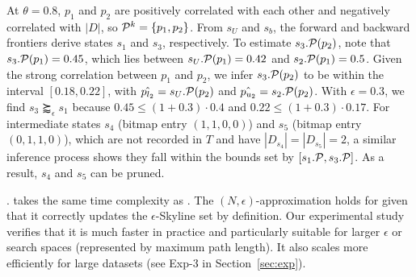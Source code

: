 \begin{example}

At $\theta=0.8$, $p_1$ and $p_2$ are positively correlated with each other and negatively correlated with $|D|$, so $\P^k = \{p_1, p_2\}$.
From $s_U$ and $s_b$, the forward and backward frontiers derive states $s_1$ and $s_3$, respectively.
To estimate $s_3.\P(p_2)$, note that $s_3.\P(p_1) = 0.45$, which lies between $s_U.\P(p_1) = 0.42$ and $s_2.\P(p_1) = 0.5$.
Given the strong correlation between $p_1$ and $p_2$,
we infer $s_3.\P(p_2)$ to be within the interval 
$[0.18, 0.22]$, with $\hat{p_{l_2}} = s_U.\P(p_2)$ and $\hat{p_{u_2}} = s_2.\P(p_2)$. 
With $\epsilon=0.3$, we find $s_3 \succapprox_{\epsilon} s_1$ because $0.45 \leq (1+0.3)\cdot0.4$ and $0.22 \leq (1+0.3)\cdot0.17$. 
For intermediate states $s_4$ (bitmap entry $(1, 1, 0, 0)$) and $s_5$ (bitmap entry $(0, 1, 1, 0)$), which are not recorded in $T$ and have $|D_{s_4}| = |D_{s_5}| = 2$, a similar inference process shows they fall within the bounds set by $[s_1.\P, s_3.\P]$. As a
result, $s_4$ and $s_5$ can be pruned.
\end{example}

. 
\bimodis 
takes the same time complexity as \apxmodis. 
The $(N, \epsilon)$-approximation holds 
for \bimodis given that it correctly updates 
the $\epsilon$-Skyline set by definition. 
Our experimental study verifies that it is much faster in practice and particularly suitable for larger $\epsilon$ or search spaces (represented by maximum path length). It also scales more efficiently for large datasets (see Exp-3 in Section~\ref{sec:exp}).



